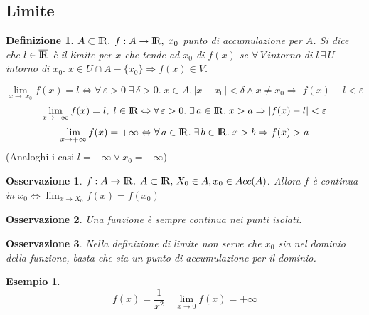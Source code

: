 \documentclass[12pt, a4paper]{article}
\theoremstyle{break}
\newtheorem{definition}{Definizione}[subsection]
\newtheorem{example}{Esempio}[subsection]
\newtheorem{observation}{Osservazione}[subsection]
\newcommand\R{{\rm I\!R}}
\begin{document}
    \subsection{Limite}
    \begin{definition}
        $A\subset\R,\;f:A\rightarrow\R ,\; x_0$ punto di accumulazione per $A$. Si dice che $l\in\overline{\R}$ è il limite per $x$ che tende ad $x_0$ di $f(x)$ se $\forall\, V\, intorno$ di $l\,\exists\, U$ intorno di $x_0.\; x\in U\cap A-\{x_0\}\Rightarrow f(x)\in V$.
    \end{definition}
    \[\lim_{x\rightarrow\ x_0} f(x) = l \Leftrightarrow \forall\, \varepsilon>0\;\exists\,\delta > 0.\; x\in A, |x-x_0| < \delta \wedge x\neq x_0 \Rightarrow |f(x)-l< \varepsilon\]
    \[\lim_{x\rightarrow +\infty} f(x) = l,\; l\in\R \Leftrightarrow \forall\,\varepsilon > 0.\; \exists\, a \in\R.\; x>a \Rightarrow |f(x)-l|< \varepsilon\]
    \[\lim_{x\rightarrow +\infty} f(x) = +\infty \Leftrightarrow \forall\, a \in\R.\; \exists\, b \in\R.\; x>b \Rightarrow f(x)> a\]
    (Analoghi i casi $l=-\infty \vee x_0 = -\infty$)
    \begin{observation}
        $f:A\rightarrow\R,\; A\subset\R,\,X_0\in A, x_0\in Acc(A)$. Allora $f$ è continua in $x_0 \Leftrightarrow \lim_{x\rightarrow X_0} f(x) = f(x_0)$ 
    \end{observation}
    \begin{observation}
        Una funzione è sempre continua nei punti isolati.
    \end{observation}
    \begin{observation}
        Nella definizione di limite non serve che $x_0$ sia nel dominio della funzione, basta che sia un punto di accumulazione per il dominio.
    \end{observation}
    \begin{example}
        \[f(x) = \frac{1}{x^2}\quad\lim_{x\rightarrow 0} f(x) = +\infty\]
        \begin{figure}[!htb]
            \centering
        \end{figure}
    \end{example}
\end{document}
